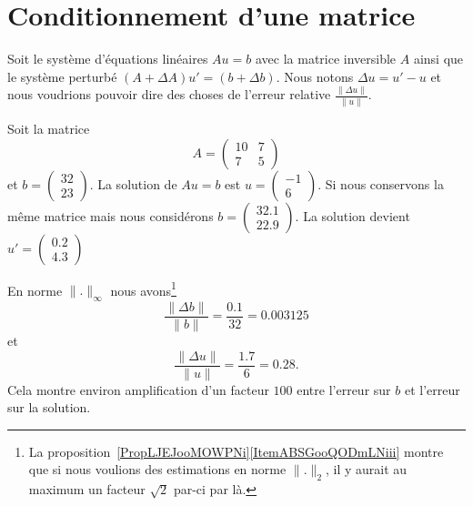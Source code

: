
\section{Conditionnement d'une matrice}
\label{SECooQGLRooZQzzsA}

Soit le système d'équations linéaires \( Au=b\) avec la matrice inversible \( A\) ainsi que le système perturbé \( (A+\Delta A)u'=(b+\Delta b)\). Nous notons \( \Delta u=u'-u\) et nous voudrions pouvoir dire des choses de l'erreur relative \( \frac{ \| \Delta u \| }{ \| u \| }\).

\begin{example}
    Soit la matrice
    \begin{equation}
        A=\begin{pmatrix}
            10    &   7    \\
            7    &   5
        \end{pmatrix}
    \end{equation}
    et \( b=\begin{pmatrix}
        32    \\
        23
    \end{pmatrix}\). La solution de \( Au=b\) est \( u=\begin{pmatrix}
        -1    \\
        6
    \end{pmatrix}\). Si nous conservons la même matrice mais nous considérons \( b=\begin{pmatrix}
        32.1    \\
        22.9
    \end{pmatrix}\). La solution devient \( u'=\begin{pmatrix}
        0.2    \\
        4.3
    \end{pmatrix}\)

    En norme \( \| . \|_{\infty}\) nous avons\footnote{La proposition~\ref{PropLJEJooMOWPNi}\ref{ItemABSGooQODmLNiii} montre que si nous voulions des estimations en norme \( \| . \|_2\), il y aurait au maximum un facteur \( \sqrt{2}\) par-ci par là.}
    \begin{equation}
        \frac{ \| \Delta b \| }{ \| b \| }=\frac{ 0.1 }{ 32 }=0.003125
    \end{equation}
    et
    \begin{equation}
        \frac{ \| \Delta u \| }{ \| u \| }=\frac{ 1.7 }{ 6 }=0.28.
    \end{equation}
    Cela montre environ amplification d'un facteur \( 100\) entre l'erreur sur \( b\) et l'erreur sur la solution.
\end{example}

